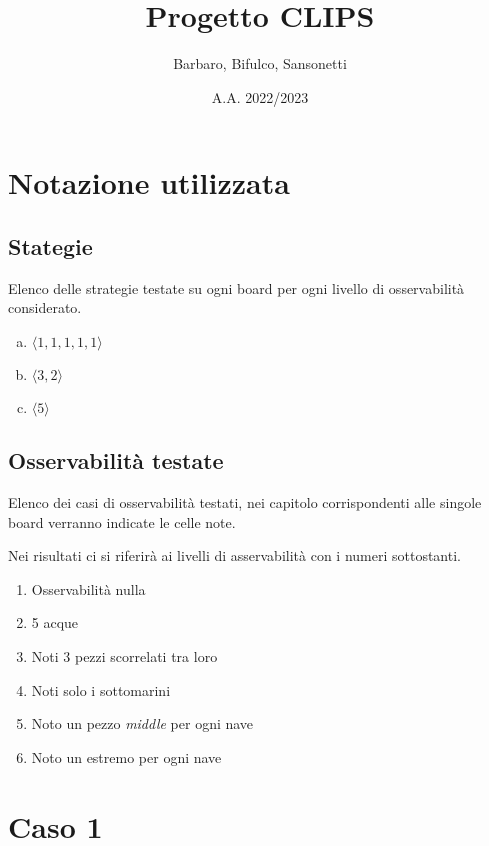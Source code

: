 \documentclass[11pt]{article}
\author{Barbaro, Bifulco, Sansonetti}
\title{Progetto CLIPS}
\date{A.A. 2022/2023}
\begin{document}
\maketitle

\section*{Notazione utilizzata}
\subsection*{Stategie}
Elenco delle strategie testate su ogni board per ogni livello di osservabilità considerato.

\begin{enumerate}[a.]
    \item $\langle 1, 1, 1, 1, 1 \rangle$
    \item $\langle 3, 2 \rangle$
    \item $\langle 5 \rangle$
\end{enumerate}

\subsection*{Osservabilità testate}
Elenco dei casi di osservabilità testati, nei capitolo corrispondenti alle singole board verranno indicate le celle note.

Nei risultati ci si riferirà ai livelli di asservabilità con i numeri sottostanti.

\begin{enumerate}
    \item Osservabilità nulla
    \item 5 acque 
    \item Noti 3 pezzi scorrelati tra loro
    \item Noti solo i sottomarini
    \item Noto un pezzo \emph{middle} per ogni nave
    \item Noto un estremo per ogni nave
\end{enumerate}

\section{Caso 1}
\end{document}
